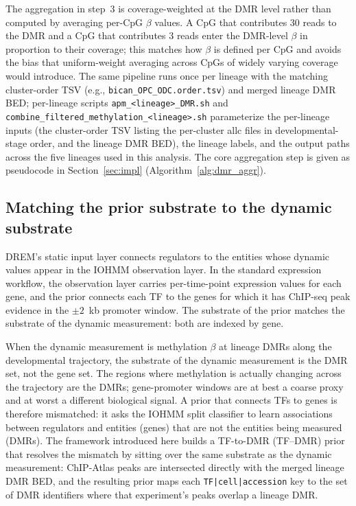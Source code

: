 \documentclass[sigconf,nonacm]{acmart}
\begin{document}
The aggregation in step~3 is coverage-weighted at the DMR level
rather than computed by averaging per-CpG $\beta$ values. A CpG
that contributes 30 reads to the DMR and a CpG that contributes
3 reads enter the DMR-level $\beta$ in proportion to their
coverage; this matches how $\beta$ is defined per CpG and avoids
the bias that uniform-weight averaging across CpGs of widely
varying coverage would introduce. The same pipeline runs once per
lineage with the matching cluster-order TSV (e.g.,
\texttt{bican\_OPC\_ODC.order.tsv}) and merged lineage DMR BED;
per-lineage scripts \texttt{apm\_<lineage>\_DMR.sh} and
\texttt{combine\_filtered\_methylation\_<lineage>.sh} parameterize
the per-lineage inputs (the cluster-order TSV listing the
per-cluster allc files in developmental-stage order, and the lineage
DMR BED), the lineage labels, and the output paths across the five
lineages used in this analysis. The core aggregation step is given as pseudocode in
Section~\ref{sec:impl} (Algorithm~\ref{alg:dmr_aggr}).

\subsection{Matching the prior substrate to the dynamic substrate}
\label{sec:framework:substrate}

DREM's static input layer connects regulators to the entities whose
dynamic values appear in the IOHMM observation layer. In the standard
expression workflow, the observation layer carries per-time-point
expression values for each gene, and the prior connects each TF to
the genes for which it has ChIP-seq peak evidence in the
$\pm 2$~kb promoter window. The substrate of the prior matches the
substrate of the dynamic measurement: both are indexed by gene.

When the dynamic measurement is methylation $\beta$ at lineage DMRs
along the developmental trajectory, the substrate of the dynamic
measurement is the DMR set, not the gene set. The regions where
methylation is actually changing across the trajectory are the DMRs;
gene-promoter windows are at best a coarse proxy and at worst a
different biological signal. A prior that connects TFs to genes is
therefore mismatched: it asks the IOHMM split classifier to learn
associations between regulators and entities (genes) that are not the
entities being measured (DMRs). The framework introduced here builds
a TF-to-DMR (TF--DMR) prior that resolves the mismatch by sitting
over the same substrate as the dynamic measurement: ChIP-Atlas peaks are intersected directly with
the merged lineage DMR BED, and the resulting prior maps each
\texttt{TF|cell|accession} key to the set of DMR identifiers where
that experiment's peaks overlap a lineage DMR.
\end{document}
